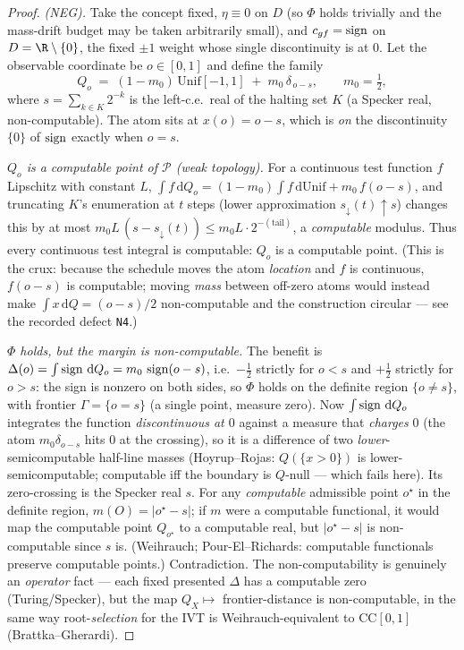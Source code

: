 \begin{proof}
\emph{(NEG).} Take the concept fixed, $\eta\equiv0$ on $D$ (so $\Phi$ holds trivially and the
mass-drift budget may be taken arbitrarily small), and $c_{gf}=\operatorname{sign}$ on $D=\R\setminus\{0\}$,
the fixed $\pm1$ weight whose single discontinuity is at $0$. Let the observable coordinate be
$o\in[0,1]$ and define the family
\[
   Q_o\;=\;(1-m_0)\,\mathrm{Unif}[-1,1]\;+\;m_0\,\delta_{\,o-s},\qquad m_0=\tfrac12,
\]
where $s=\sum_{k\in K}2^{-k}$ is the left-c.e.\ real of the halting set $K$ (a Specker real,
non-computable). The atom sits at $x(o)=o-s$, which is \emph{on} the discontinuity $\{0\}$ of
$\operatorname{sign}$ exactly when $o=s$.

\emph{$Q_o$ is a computable point of $\mathcal P$ (weak topology).} For a continuous test
function $f$ Lipschitz with constant $L$, $\int f\,\mathrm dQ_o=(1-m_0)\!\int f\,\mathrm
d\mathrm{Unif}+m_0\,f(o-s)$, and truncating $K$'s enumeration at $t$ steps (lower approximation
$s_{\downarrow}(t)\uparrow s$) changes this by at most $m_0L\,(s-s_{\downarrow}(t))\le
m_0L\cdot 2^{-(\text{tail})}$, a \emph{computable} modulus. Thus every continuous test integral
is computable: $Q_o$ is a computable point. (This is the crux: because the schedule moves the
atom \emph{location} and $f$ is continuous, $f(o-s)$ is computable; moving \emph{mass} between
off-zero atoms would instead make $\int x\,\mathrm dQ=(o-s)/2$ non-computable and the
construction circular --- see the recorded defect \texttt{N4}.)

\emph{$\Phi$ holds, but the margin is non-computable.} The benefit is $\Delta(o)=\int\operatorname{sign}\,
\mathrm dQ_o=m_0\,\operatorname{sign}(o-s)$, i.e.\ $-\tfrac12$ strictly for $o<s$ and $+\tfrac12$ strictly for
$o>s$: the sign is nonzero on both sides, so $\Phi$ holds on the definite region $\{o\neq s\}$,
with frontier $\Gamma=\{o=s\}$ (a single point, measure zero). Now $\int\operatorname{sign}\,\mathrm dQ_o$
integrates the function \emph{discontinuous at $0$} against a measure that \emph{charges} $0$
(the atom $m_0\delta_{o-s}$ hits $0$ at the crossing), so it is a difference of two
\emph{lower}-semicomputable half-line masses (Hoyrup--Rojas: $Q(\{x>0\})$ is lower-semicomputable;
computable iff the boundary is $Q$-null --- which fails here). Its zero-crossing is the Specker
real $s$. For any \emph{computable} admissible point $o^\star$ in the definite region,
$m(O)=|o^\star-s|$; if $m$ were a computable functional, it would map the computable point
$Q_{o^\star}$ to a computable real, but $|o^\star-s|$ is non-computable since $s$ is. (Weihrauch;
Pour-El--Richards: computable functionals preserve computable points.) Contradiction. The
non-computability is genuinely an \emph{operator} fact --- each fixed presented $\Delta$ has a
computable zero (Turing/Specker), but the map $Q_X\mapsto$ frontier-distance is non-computable,
in the same way root-\emph{selection} for the IVT is Weihrauch-equivalent to $\mathrm{CC}[0,1]$
(Brattka--Gherardi).


\end{proof}
